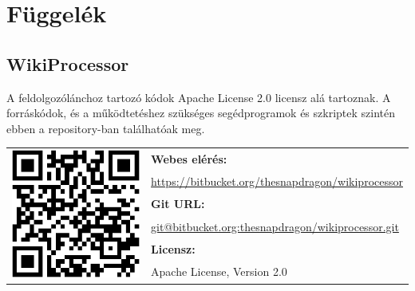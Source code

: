 \chapter*{Függelék}

\section{WikiProcessor}
\label{sec:wikiprocessor}

A feldolgozólánchoz tartozó kódok Apache License 2.0 licensz alá tartoznak. A forráskódok, és a működtetéshez szükséges segédprogramok és szkriptek szintén ebben a repository-ban találhatóak meg.

\begin{table}[htb]
\begin{center}
\begin{tabular}{cl}
\multirow{6}{*}{\includegraphics[scale=0.3]{img/qrcode}}
& \textbf{Webes elérés:} \\
& \url{https://bitbucket.org/thesnapdragon/wikiprocessor} \\
& \textbf{Git URL:} \\
& \url{git@bitbucket.org:thesnapdragon/wikiprocessor.git} \\
& \textbf{Licensz:} \\
& Apache License, Version 2.0 \\
\end{tabular}
\end{center}
\end{table}

